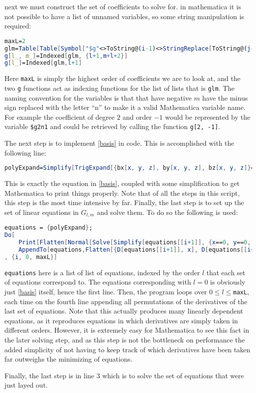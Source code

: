 \documentclass{article}
\begin{document}
next we must construct the set of coefficients to solve for. in mathematica it is not possible to have a list of unnamed variables, so some string manipulation is required:

\begin{lstlisting}[language=mathematica]
maxL=2
glm=Table[Table[Symbol["$g"<>ToString@(i-1)<>StringReplace[ToString@(j-i-1), "-"->"n"]],{j,2i+1}],{i,maxL+1}]
g[l_, m_]=Indexed[glm, {l+1,m+l+2}]
g[l_]=Indexed[glm,l+1]
\end{lstlisting}

Here \lstinline{maxL} is simply the highest order of coefficients we are to look at, and the two \lstinline{g} functions act as indexing functions for the list of lists that is \lstinline{glm}. The naming convention for the variables is that that have negative $m$ have the minus sign replaced with the letter ``n'' to make it a valid Mathematica variable name. For example the coefficient of degree $2$ and order $-1$ would be represented by the variable \lstinline{$g2n1} and could be retrieved by calling the function \lstinline{g[2, -1]}. 

The next step is to implement \ref{basis} in code. This is accomplished with the following line: 

\begin{lstlisting}[language=Mathematica]
polyExpand=Simplify[TrigExpand[{bx[x, y, z], by[x, y, z], bz[x, y, z]}==Sum[Sum[g[l,m]*pi[l, m, x, y, z], {m, -l-1, l+1}], {l, 0, maxL}]], x^2+y^2+z^2>0]
\end{lstlisting}

This is exactly the equation in \ref{basis}, coupled with some simplification to get Mathematica to print things properly. Note that of all the steps in this script, this step is the most time intensive by far. Finally, the last step is to set up the set of linear equations in $G_{l, m}$ and solve them. To do so the following is used: 

\begin{lstlisting}[language=Mathematica]
equations = {polyExpand};
Do[
    Print[Flatten[Normal[Solve[Simplify[equations[[i+1]], {x==0, y==0, z==0}], g[i], MaxExtraConditions->Automatic]]]];
    AppendTo[equations,Flatten[{D[equations[[i+1]], x], D[equations[[i+1]], y], D[equations[[i+1]], z]}]]
, {i, 0, maxL}]
\end{lstlisting}

\lstinline{equations} here is a list of list of equations, indexed by the order $l$ that each set of equations correspond to. The equations corresponding with $l=0$ is obviously just \ref{basis} itself, hence the first line. Then, the program loops over $0\leq l\leq$\lstinline{maxL}, each time on the fourth line appending all permutations of the derivatives of the last set of equations. Note that this actually produces many linearly dependent equations, as it reproduces equations in which derivatives are simply taken in different orders. However, it is extremely easy for Mathematica to see this fact in the later solving step, and as this step is not the bottleneck on performance the added simplicity of not having to keep track of which derivatives have been taken far outweighs the minimizing of equations. 

Finally, the last step is in line 3 which is to solve the set of equations that were just layed out. 

\printbibliography
\end{document}
